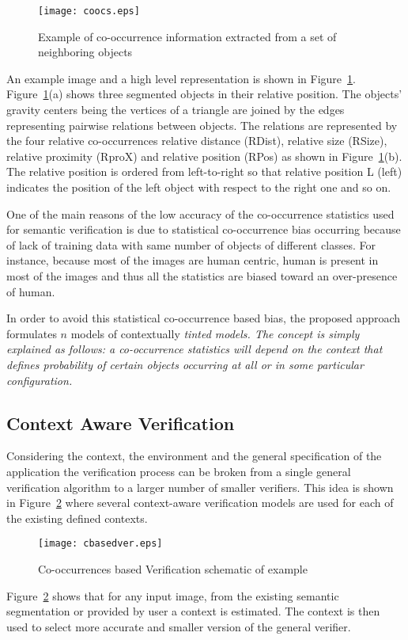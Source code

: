 \documentclass[conference]{IEEEtran}
\begin{document}
\begin{figure}[ht]
	\centering
	\texttt{[image: coocs.eps]}
	\caption{\label{fig:coocs}Example of co-occurrence information extracted from a set of neighboring objects}
\end{figure}

An example image and a high level representation is shown in Figure~\ref{fig:coocs}. Figure~\ref{fig:coocs}(a) shows three segmented objects in their relative position. The objects' gravity centers being the vertices of a triangle are joined by the edges representing pairwise relations between objects. The relations are represented by the four relative co-occurrences relative distance (RDist), relative size (RSize), relative proximity (RproX) and relative position (RPos) as shown in Figure~\ref{fig:coocs}(b). The relative position is ordered from left-to-right so that relative position L (left) indicates the position of the left object with respect to the right one and so on. 

One of the main reasons of the low accuracy of the co-occurrence statistics used for semantic verification is due to statistical co-occurrence bias occurring because of lack of training data with same number of objects of different classes. For instance, because most of the images are human centric, human is present in most of the images and thus all the statistics are biased toward an over-presence of human. 

In order to avoid this statistical co-occurrence based bias, the proposed approach formulates $n$ models of contextually \em tinted \em models. The concept is simply explained as follows: a co-occurrence statistics will depend on the context that defines probability of certain objects occurring at all or in some particular configuration. 


\subsection{Context Aware Verification}

Considering the context, the environment and the general specification of the application the verification process can be broken from a single general verification algorithm to a larger number of smaller verifiers. This idea is shown in Figure~\ref{fig:cbv} where several context-aware verification models are used for each of the existing defined contexts. 

\begin{figure}[bht]
\centering
	\texttt{[image: cbasedver.eps]}
	\caption{\label{fig:cbv}Co-occurrences based Verification schematic of example}
\end{figure}
Figure~\ref{fig:cbv} shows that for any input image, from the existing semantic segmentation or provided by user a context is estimated. The context is then used to select more accurate and smaller version of the general verifier.
\end{document}
